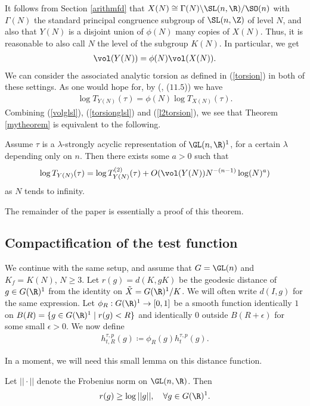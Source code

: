 It follows from Section \ref{arithmfd} that $X(N)\cong \Gamma(N)\backslash \SL(n,\R)/\SO(n)$ with $\Gamma(N)$ the standard principal congruence subgroup of $\SL(n,\Z)$ of level $N$, and also that $Y(N)$ is a disjoint union of $\phi(N)$ many copies of $X(N)$. Thus, it is reasonable to also call $N$ the level of the subgroup $K(N)$. In particular, we get
\begin{align}\label{volglsl}
    \vol(Y(N)) = \phi(N)\vol(X(N)).
\end{align}
We can consider the associated analytic torsion as defined in (\ref{torsion}) in both of these settings. As one would hope for, by (\cite{MzM2}, ($11.5$)) we have
\begin{align}\label{torsionglsl}
    \log T_{Y(N)}(\tau) = \phi(N)\log T_{X(N)}(\tau).
\end{align}
Combining (\ref{volglsl}), (\ref{torsionglsl}) and (\ref{l2torsion}), we see that Theorem \ref{mytheorem} is equivalent to the following.
\begin{thm}\label{glmytheorem}
    Assume $\tau$ is a $\lambda$-strongly acyclic representation of $\GL(n,\R)^1$, for a certain $\lambda$ depending only on $n$. Then there exists some $a>0$ such that
    $$\log T_{Y(N)}(\tau) = \log T_{Y(N)}^{(2)}(\tau)+O(\vol(Y(N))N^{-(n-1)}\log(N)^a)$$
    as $N$ tends to infinity.
\end{thm}
\noindent The remainder of the paper is essentially a proof of this theorem. 


\subsection{Compactification of the test function}\label{compactsub}

\noindent We continue with the same setup, and assume that $G=\GL(n)$ and $K_f=K(N)$, $N\geq 3$. Let $r(g)=d(K,gK)$ be the geodesic distance of $g\in G(\R)^1$ from the identity on $\Tilde{X}=G(\R)^1/K$. We will often write $d(I,g)$ for the same expression. Let $\phi_R:G(\R)^1\to [0,1]$ be a smooth function identically $1$ on $B(R)=\lbrace g\in G(\R)^1\mid r(g)< R\rbrace$ and identically $0$ outside $B(R+\epsilon)$ for some small $\epsilon>0$. We now define
\begin{align*}
    h_{t,R}^{\tau,p}(g)\coloneqq \phi_R(g)h_t^{\tau,p}(g).
\end{align*}

\noindent In a moment, we will need this small lemma on this distance function.

\begin{lem}\label{distancebound}
    Let $||\cdot||$ denote the Frobenius norm on $\GL(n,\R)$. Then
    \begin{align*}
        r(g) \geq \log ||g||, \quad \forall g\in G(\R)^1.
    \end{align*}
\end{lem}

